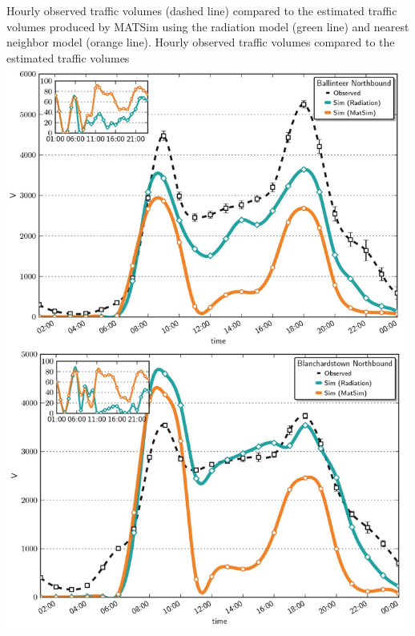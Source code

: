 \createfigure%
{Hourly observed traffic volumes (dashed line) compared to the estimated traffic volumes produced by MATSim using the radiation model (green line) and nearest neighbor model (orange line).}%
{Hourly observed traffic volumes compared to the estimated traffic volumes}%
{\label{fig:dublin1}}%
{\includegraphics[width=0.99\textwidth, angle=0]{using/figures/dublin1.png}}%
{}






